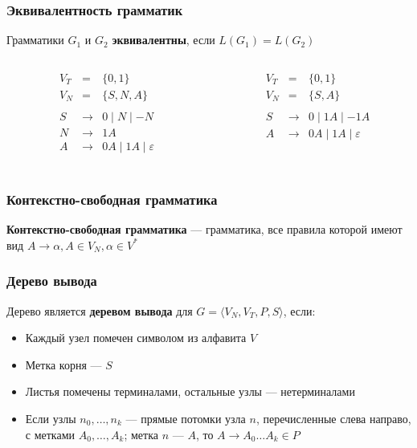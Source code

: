 \documentclass{beamer}
\begin{document}
\begin{frame}[fragile]
  \transwipe[direction=90]
  \frametitle{Эквивалентность грамматик}
\begin{center}
  Грамматики $G_1$ и $G_2$ \textbf{эквивалентны}, если $L(G_1) = L(G_2)$ 
\end{center}

\pause
  
\begin{columns}
  \begin{column}{0.45\textwidth}
\[ 
  \begin{array}{crcl}
  &V_T &=& \{ 0, 1 \} \\
  &V_N &=& \{ S, N, A \} \\~\\
  &S& \rightarrow & 0 \mid N \mid - N  \\
  &N& \rightarrow & 1 A \\
  &A& \rightarrow & 0 A \mid 1 A  \mid \varepsilon\\
  \end{array}
\]          
  \end{column}

  \begin{column}{0.55\textwidth}
\[
  \begin{array}{crcl}
  &V_T &=& \{ 0, 1 \} \\
  &V_N &=& \{ S, A \} \\~\\
  &S& \rightarrow & 0 \mid 1 A  \mid - 1 A  \\
  &A& \rightarrow &  0 A \mid 1 A  \mid \varepsilon\\
  \end{array}
\]    
  \end{column}
\end{columns}  
\end{frame}

\begin{frame}[fragile]
  \transwipe[direction=90]
  \frametitle{Контекстно-свободная грамматика}
    \begin{center}
      \textbf{Контекстно-свободная грамматика} --- грамматика, все правила которой имеют вид $A \rightarrow \alpha, A \in V_N, \alpha \in V^*$
    \end{center}
\end{frame}

\begin{frame}[fragile]
  \transwipe[direction=90]
  \frametitle{Дерево вывода}
  
  Дерево является \textbf{деревом вывода} для $G = \langle V_N, V_T, P, S\rangle$, если:  
  \begin{itemize}
    \item Каждый узел помечен символом из алфавита $V$
    \item Метка корня --- $S$
    \item Листья помечены терминалами, остальные узлы --- нетерминалами
    \item Если узлы $n_0, \dots, n_k$ --- прямые потомки узла $n$, перечисленные слева направо, с метками $A_0, \dots, A_k$; метка $n$ --- $A$, то $A \rightarrow A_0 \dots A_k \in P$
  \end{itemize}
\end{frame}
\end{document}
